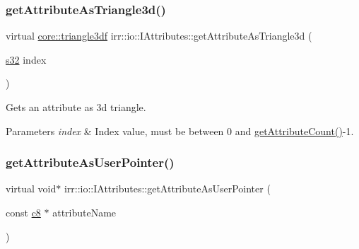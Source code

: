 \subsubsection{\texorpdfstring{get\+Attribute\+As\+Triangle3d()}{getAttributeAsTriangle3d()}\hspace{0.1cm}{\footnotesize\ttfamily [2/2]}}
{\footnotesize\ttfamily virtual \hyperlink{namespaceirr_1_1core_a1112835405bbec5dadf031dc7934e7d0}{core\+::triangle3df} irr\+::io\+::\+I\+Attributes\+::get\+Attribute\+As\+Triangle3d (\begin{DoxyParamCaption}\item[{\hyperlink{namespaceirr_ac66849b7a6ed16e30ebede579f9b47c6}{s32}}]{index }\end{DoxyParamCaption})\hspace{0.3cm}{\ttfamily [pure virtual]}}



Gets an attribute as 3d triangle. 


\begin{DoxyParams}{Parameters}
{\em index} & Index value, must be between 0 and \hyperlink{classirr_1_1io_1_1IAttributes_a796bdd9440ee7ba0b6742a90a82870b6}{get\+Attribute\+Count()}-\/1. \\
\hline
\end{DoxyParams}
\mbox{\label{classirr_1_1io_1_1IAttributes_a6f97e7af81f611bd13ced0378531ed2d}} 
\subsubsection{\texorpdfstring{get\+Attribute\+As\+User\+Pointer()}{getAttributeAsUserPointer()}\hspace{0.1cm}{\footnotesize\ttfamily [1/2]}}
{\footnotesize\ttfamily virtual void$\ast$ irr\+::io\+::\+I\+Attributes\+::get\+Attribute\+As\+User\+Pointer (\begin{DoxyParamCaption}\item[{const \hyperlink{namespaceirr_a9395eaea339bcb546b319e9c96bf7410}{c8} $\ast$}]{attribute\+Name }\end{DoxyParamCaption})\hspace{0.3cm}{\ttfamily [pure virtual]}}



